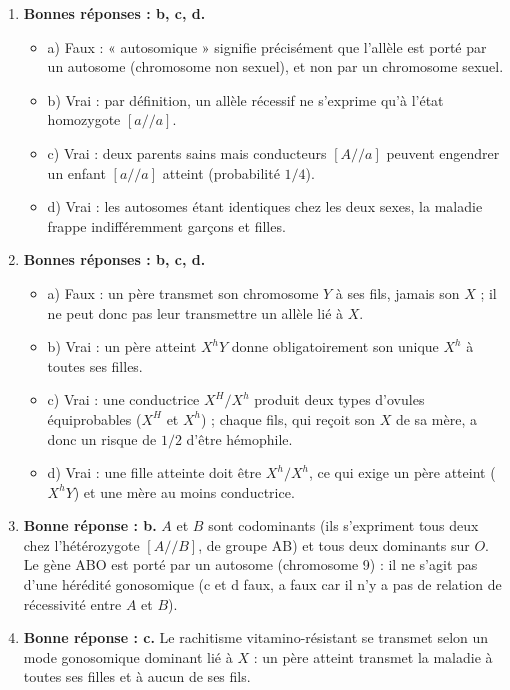 \documentclass[11pt]{article}
\newcommand{\cle}[1]{{\popxbold\color{popdark}#1}}
\begin{document}
\begin{corrige}
\begin{enumerate}
\item \textbf{Bonnes réponses : b, c, d.}
\begin{itemize}
\item a) Faux : « autosomique » signifie précisément que l'allèle est porté par un \cle{autosome} (chromosome non sexuel), et non par un chromosome sexuel.
\item b) Vrai : par définition, un allèle \cle{récessif} ne s'exprime qu'à l'état \cle{homozygote} $[a//a]$.
\item c) Vrai : deux parents sains mais \cle{conducteurs} $[A//a]$ peuvent engendrer un enfant $[a//a]$ atteint (probabilité $1/4$).
\item d) Vrai : les autosomes étant identiques chez les deux sexes, la maladie frappe indifféremment garçons et filles.
\end{itemize}
\item \textbf{Bonnes réponses : b, c, d.}
\begin{itemize}
\item a) Faux : un père transmet son chromosome $Y$ à ses fils, jamais son $X$ ; il ne peut donc pas leur transmettre un allèle lié à $X$.
\item b) Vrai : un père atteint $X^{h}Y$ donne obligatoirement son unique $X^{h}$ à toutes ses filles.
\item c) Vrai : une conductrice $X^{H}/X^{h}$ produit deux types d'ovules équiprobables ($X^{H}$ et $X^{h}$) ; chaque fils, qui reçoit son $X$ de sa mère, a donc un risque de $1/2$ d'être hémophile.
\item d) Vrai : une fille atteinte doit être $X^{h}/X^{h}$, ce qui exige un père atteint ($X^{h}Y$) et une mère au moins conductrice.
\end{itemize}
\item \textbf{Bonne réponse : b.} $A$ et $B$ sont \cle{codominants} (ils s'expriment tous deux chez l'hétérozygote $[A//B]$, de groupe AB) et tous deux \cle{dominants} sur $O$. Le gène ABO est porté par un autosome (chromosome 9) : il ne s'agit pas d'une hérédité gonosomique (c et d faux, a faux car il n'y a pas de relation de récessivité entre $A$ et $B$).
\item \textbf{Bonne réponse : c.} Le rachitisme vitamino-résistant se transmet selon un mode \cle{gonosomique dominant lié à $X$} : un père atteint transmet la maladie à toutes ses filles et à aucun de ses fils.
\end{enumerate}
\end{corrige}
\end{document}
